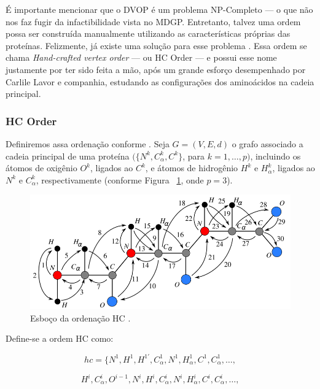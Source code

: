 \documentclass[a4paper,12pt]{article}
\begin{document}
	É importante mencionar que o DVOP é um problema NP-Completo \cite{carlile:dvopComplexity} --- o que não nos faz fugir da infactibilidade vista no MDGP. Entretanto, talvez uma ordem possa ser construída manualmente utilizando as características próprias das proteínas. Felizmente, já existe uma solução para esse problema \cite{carlile:MinimalOrder}. Essa ordem se chama \textit{Hand-crafted vertex order} --- ou HC Order --- e possui esse nome justamente por ter sido feita a mão, após um grande esforço desempenhado por Carlile Lavor e companhia, estudando as configurações dos aminoácidos na cadeia principal.
	
	\subsubsection*{HC Order}
	Definiremos assa ordenação conforme \cite{carlile:MinimalOrder}. Seja $G = (V, E, d)$ o grafo associado a cadeia principal de uma proteína $(\{N^k, C^{k}_\alpha,C^k\}$, para $k = 1,\dots,p)$, incluindo os átomos de oxigênio $O^k$, ligados ao $C^k$, e átomos de hidrogênio $H^k$ e $H^{k}_\alpha$, ligados ao $N^k$ e $C^{k}_\alpha$, respectivamente (conforme Figura ~\ref{fig:hcVO}, onde $p = 3$).
	
	\begin{figure}[H]
		\begin{center}
			\includegraphics[width=0.8\linewidth]{hcVO.png}
		\end{center}
		\caption{Esboço da ordenação HC \cite{carlile:MinimalOrder}.}
		\label{fig:hcVO}
	\end{figure}	
	Define-se a ordem HC como:
	
	\begin{minipage}{0.532\linewidth}
		$$
		hc = \{ N^1, H^1, H^{1'}, C_{\alpha}^1, N^1, H_{\alpha}^1, C^1, C_{\alpha}^1, \dots,
		$$
		
	\end{minipage}
	$$
	H^i, C_{\alpha}^i, O^{i-1}, N^i, H^i, C^{i}_\alpha, N^i, H^{i}_\alpha, C^i, C_{\alpha}^i,\dots,
	$$
	
\end{document}
